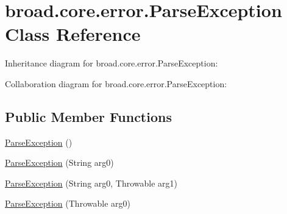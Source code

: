 \hypertarget{classbroad_1_1core_1_1error_1_1_parse_exception}{\section{broad.\+core.\+error.\+Parse\+Exception Class Reference}
\label{classbroad_1_1core_1_1error_1_1_parse_exception}
}


Inheritance diagram for broad.\+core.\+error.\+Parse\+Exception\+:


Collaboration diagram for broad.\+core.\+error.\+Parse\+Exception\+:
\subsection*{Public Member Functions}
\begin{DoxyCompactItemize}
\item 
\hyperlink{classbroad_1_1core_1_1error_1_1_parse_exception_a34f525662b0d05bd755a9d85194b74eb}{Parse\+Exception} ()
\item 
\hyperlink{classbroad_1_1core_1_1error_1_1_parse_exception_aed267de43ab597e54f2a3c8676d32e1d}{Parse\+Exception} (String arg0)
\item 
\hyperlink{classbroad_1_1core_1_1error_1_1_parse_exception_a6255d9b9993564a3fba5a48f0f1e3efd}{Parse\+Exception} (String arg0, Throwable arg1)
\item 
\hyperlink{classbroad_1_1core_1_1error_1_1_parse_exception_a7dfecb5d01df6d954c2fda87c45353b9}{Parse\+Exception} (Throwable arg0)
\end{DoxyCompactItemize}


